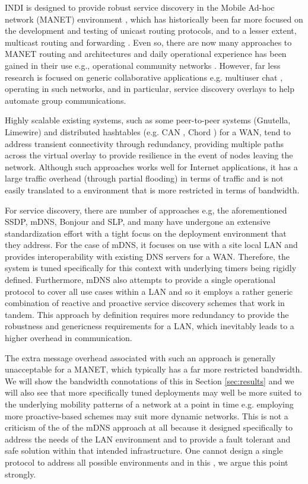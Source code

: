 INDI is designed to provide robust service discovery in the Mobile Ad-hoc network (MANET) environment \cite{basagni2004mobile, broch1998, perkins2000}, which has historically been far more focused on the development and testing of unicast routing protocols, and to a lesser extent, multicast routing and forwarding  \cite{lee1999demand,camp2002,macker2004simplified}. Even so, there are now many approaches to MANET routing and architectures and daily operational experience has been gained in their use e.g., operational community networks \cite{funkfeuer}.  However, far less research is focused on generic collaborative applications e.g. multiuser chat \cite{XMPPCore}, operating in such networks, and in particular, service discovery overlays to help automate group communications.

\sloppypar Highly scalable existing systems, such as some peer-to-peer systems (Gnutella, Limewire) and distributed hashtables (e.g. CAN \cite{can}, Chord \cite{chord}) for a WAN, tend to address transient connectivity through redundancy, providing multiple paths across the virtual overlay to provide resilience in the event of nodes leaving the network. Although such approaches works well for Internet applications, it has a large traffic overhead (through partial flooding) in terms of traffic and is not easily translated to a  environment that is more restricted in terms of bandwidth.  

For service discovery, there are number of approaches e.g, the aforementioned SSDP, mDNS, Bonjour and SLP, and many  have undergone an extensive standardization effort with a tight focus on the deployment environment that they address.  For the case of mDNS, it focuses on use with a site local LAN and provides interoperability with existing DNS servers for a WAN.  Therefore, the system is tuned specifically for this context with underlying timers being rigidly defined. Furthermore, mDNS also attempts to provide a single operational protocol to cover all use cases within a LAN and so it employs a rather generic combination of reactive and proactive service discovery schemes that work in tandem. This approach by definition requires more redundancy to provide the robustness and genericness requirements for a LAN, which inevitably leads to a higher overhead in communication.  

The extra message overhead associated with such an approach is generally unacceptable for a MANET, which typically has a far more restricted bandwidth. We will show the bandwidth connotations of this in Section \ref{sec:results} and we will also see that more specifically tuned deployments may well be more suited to the underlying mobility patterns of a network at a point in time e.g. employing more proactive-based schemes may suit more dynamic networks.  This is not a criticism of the of the mDNS approach at all because it designed specifically to address the needs of the LAN environment and to provide a fault tolerant and safe solution within that intended infrastructure.   One cannot design a single protocol to address all possible environments and in this \doctype, we argue this point strongly.  

